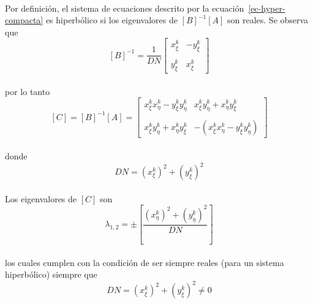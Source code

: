\documentclass[letterpaper, openright, 12pt]{book}
\begin{document}
    \paragraph*{}
    Por definición, el sistema de ecuaciones descrito por la
    ecuación~\ref{ec-hyper-compacta} es hiperbólico si los eigenvalores de
        $\left[ B \right]^{-1} \left[ A \right]$ son reales. Se observa que\\
        \begin{equation*}
            \left[ B \right]^{-1} = \frac{1}{DN}\begin{bmatrix}
            x_{\xi}^{k} & -y_{\xi}^{k} \\ \\
            y_{\xi}^{k} & x_{\xi}^{k}
            \end{bmatrix}
        \end{equation*}\\
        por lo tanto
        \begin{equation*}
            \left[ C \right] = \left[ B \right]^{-1} \left[ A \right] = \begin{bmatrix}
            x_{\xi}^{k} x_{\eta}^{k} - y_{\xi}^{k} y_{\eta}^{k} &
            x_{\xi}^{k} y_{\eta}^{k} + x_{\eta}^{k} y_{\xi}^{k} \\ \\
            x_{\xi}^{k} y_{\eta}^{k} + x_{\eta}^{k} y_{\xi}^{k} &
            - \left( x_{\xi}^{k} x_{\eta}^{k} - y_{\xi}^{k} y_{\eta}^{k} \right)
            \end{bmatrix}
        \end{equation*}\\
        donde
        \begin{equation*}
            DN = \left( x_{\xi}^{k} \right)^2 + \left( y_{\xi}^{k} \right)^2
        \end{equation*}

    \paragraph*{}
        Los eigenvalores de $\left[ C \right]$ son
        \begin{equation*}
            \lambda_{1, 2} = \pm \left[ \frac{\left(x_{\eta}^{k} \right)^2 + \left( y_{\eta}^{k} \right)^2} {DN} \right]
        \end{equation*}\\
        los cuales cumplen con la condición de ser siempre reales (para un
        sistema hiperbólico) siempre que
        \begin{equation*}
            DN = \left( x_{\xi}^{k} \right)^2 + \left( y_{\xi}^{k} \right)^2 \neq 0
        \end{equation*}
\end{document}
